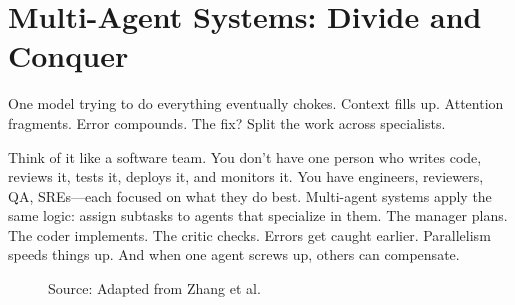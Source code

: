\documentclass[12pt,a4paper]{report}
\theoremstyle{definition}
\newcommand{\source}[1]{\vspace{-0.5\baselineskip}\caption*{\small Source: #1}}
\begin{document}
\section{Multi-Agent Systems: Divide and Conquer}
One model trying to do everything eventually chokes. Context fills up. Attention fragments. Error compounds. The fix? Split the work across specialists.

Think of it like a software team. You don't have one person who writes code, reviews it, tests it, deploys it, and monitors it. You have engineers, reviewers, QA, SREs---each focused on what they do best. Multi-agent systems apply the same logic: assign subtasks to agents that specialize in them. The manager plans. The coder implements. The critic checks. Errors get caught earlier. Parallelism speeds things up. And when one agent screws up, others can compensate.

\begin{figure}[htbp]
\centering
{}
\caption{Decentralized multi-agent architecture showing independent agents (1-4) coordinating through message passing (dashed lines) while interacting with a shared environment. Each agent operates independently while coordinating through messages. All agents interact with a shared environment, so multiple workers can run side-by-side and specialize (e.g., Agent 1: planning, Agent 2: coding, Agent 3: testing). Spreading out the control logic avoids bottlenecks and lets coordination patterns emerge organically.}
\label{fig:multi_agent}
\source{Adapted from Zhang et al.~\cite{zhang2024agentnet}}
\end{figure}
\end{document}

